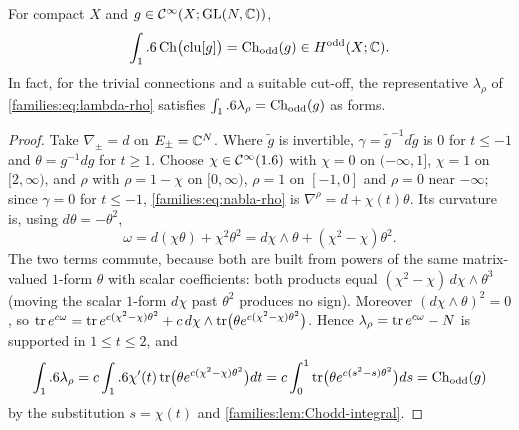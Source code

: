\begin{proposition}\label{families:prop:Chodd-clutching}
  For compact $X$ and $g\in\mathcal{C}^\infty(X;\operatorname{GL}(N,\mathbb{C}))$,
  \begin{equation*}
    \int_1.6\operatorname{Ch}\bigl(\operatorname{clu}[g]\bigr)=\operatorname{Ch}_{\mathrm{odd}}(g)\in H^{\mathrm{odd}}(X;\mathbb{C}).
  \end{equation*}
  In fact, for the trivial connections and a suitable cut-off, the representative
  $\lambda_\rho$ of \eqref{families:eq:lambda-rho} satisfies $\int_1.6\lambda_\rho=\operatorname{Ch}_{\mathrm{odd}}(g)$ as
  forms.
\end{proposition}
\begin{proof}
  Take $\nabla_\pm=d$ on $E_\pm=\mathbb{C}^N$. Where $\tilde g$ is invertible,
  $\gamma=\tilde g^{-1}d\tilde g$ is $0$ for $t\le-1$ and $\theta=g^{-1}dg$ for $t\ge1$. Choose
  $\chi\in\mathcal{C}^\infty(1.6)$ with $\chi=0$ on $(-\infty,1]$, $\chi=1$ on $[2,\infty)$, and $\rho$ with
  $\rho=1-\chi$ on $[0,\infty)$, $\rho=1$ on $[-1,0]$ and $\rho=0$ near $-\infty$; since
  $\gamma=0$ for $t\le-1$, \eqref{families:eq:nabla-rho} is $\nabla^\rho=d+\chi(t)\theta$. Its
  curvature is, using $d\theta=-\theta^2$,
  \begin{equation*}
    \omega=d(\chi\theta)+\chi^2\theta^2=d\chi\wedge\theta+(\chi^2-\chi)\theta^2 .
  \end{equation*}
  The two terms commute, because both are built from powers of the same
  matrix-valued $1$-form $\theta$ with scalar coefficients: both products equal
  $(\chi^2-\chi)\,d\chi\wedge\theta^3$ (moving the scalar $1$-form $d\chi$ past
  $\theta^2$ produces no sign). Moreover $(d\chi\wedge\theta)^2=0$, so
  $\operatorname{tr} e^{c\omega}=\operatorname{tr} e^{c(\chi^2-\chi)\theta^2}+c\,d\chi\wedge\operatorname{tr}\bigl(\theta e^{c(\chi^2-\chi)\theta^2}\bigr)$.
  Hence $\lambda_\rho=\operatorname{tr} e^{c\omega}-N$ is supported in $1\le t\le2$, and
  \begin{equation*}
    \int_1.6\lambda_\rho=c\int_1.6\chi'(t)\operatorname{tr}\bigl(\theta e^{c(\chi^2-\chi)\theta^2}\bigr)dt
    =c\int_0^1\operatorname{tr}\bigl(\theta e^{c(s^2-s)\theta^2}\bigr)ds=\operatorname{Ch}_{\mathrm{odd}}(g)
  \end{equation*}
  by the substitution $s=\chi(t)$ and \cref{families:lem:Chodd-integral}.
\end{proof}

